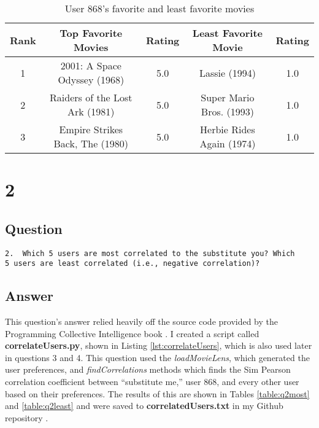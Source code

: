 \documentclass[letterpaper,11pt]{article}
\begin{document}
\begin{table}[htb]
\begin{tabular}{ | c | c | c | | c | c |}
\hline
\textbf{Rank} & \textbf{Top Favorite Movies} & \textbf{Rating} & \textbf{Least Favorite Movie} & \textbf{Rating} \\
\hline
1 & 2001: A Space Odyssey (1968) & 5.0 & Lassie (1994) & 1.0 \\
\hline
2 & Raiders of the Lost Ark (1981) & 5.0 & Super Mario Bros. (1993) & 1.0 \\
\hline
3 & Empire Strikes Back, The (1980) & 5.0 & Herbie Rides Again (1974) & 1.0 \\
\hline
\end{tabular}
\caption{User 868's favorite and least favorite movies}
\label{table:q1user3}
\end{table}

 


\clearpage


\section*{2}

\subsection*{Question}

\begin{verbatim}
2.  Which 5 users are most correlated to the substitute you? Which
5 users are least correlated (i.e., negative correlation)?
\end{verbatim}

\subsection*{Answer}

This question's answer relied heavily off the source code provided by the Programming Collective Intelligence book \cite{collectiveIntell}. I created a script called \textbf{correlateUsers.py}, shown in Listing \ref{lst:correlateUsers}, which is also used later in questions 3 and 4. This question used the \textit{loadMovieLens}, which generated the user preferences, and \textit{findCorrelations} methods which finds the Sim Pearson correlation coefficient between ``substitute me,'' user 868, and every other user based on their preferences. The results of this are shown in Tables \ref{table:q2most} and \ref{table:q2least} and were saved to \textbf{correlatedUsers.txt} in my Github repository \cite{github}.
\end{document}
